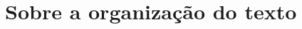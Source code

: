 \documentclass[]{politex}
\begin{document}








\section{Sobre a organização do texto}\label{organizacao}
\end{document}
